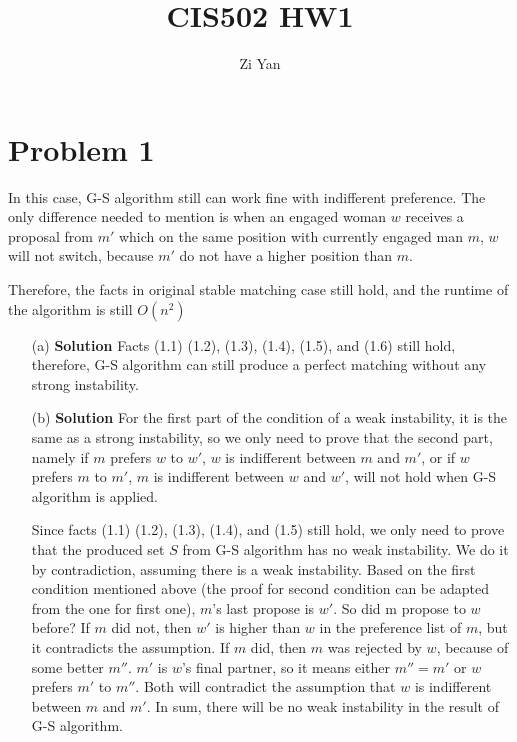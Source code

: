 \documentclass[12pt,letterpaper]{article}
\author{Zi Yan}
\title{CIS502 HW1}
\begin{document}
\maketitle

\section*{Problem 1}
In this case, G-S algorithm still can work fine with indifferent preference. 
The only difference needed to mention is when an engaged woman $w$ receives a 
proposal from $m'$ which on the same position with currently engaged man $m$, 
$w$ will not switch, because $m'$ do not have a higher position than $m$.

Therefore, the facts in original stable matching case still hold, and the 
runtime of the algorithm is still $O(n^2)$
\begin{itemize}
    \item[(a)] \textbf{Solution} Facts (1.1) (1.2), (1.3), (1.4), (1.5), and (1.6) still 
    hold, therefore, G-S algorithm can still produce a perfect matching without
    any strong instability.
    
    \item[(b)] \textbf{Solution} For the first part of the condition of a weak
    instability, it is the same as a strong instability, so we only need to prove
    that the second part, namely if $m$ prefers $w$ to $w'$, $w$ is indifferent
    between $m$ and $m'$, or if $w$ prefers $m$ to $m'$, $m$ is indifferent
    between $w$ and $w'$, will not hold when G-S algorithm is applied. 
    
    Since facts (1.1) (1.2), (1.3), (1.4), and (1.5) still hold, we only need to prove
    that the produced set $S$ from G-S algorithm has no weak instability. We do
    it by contradiction, assuming there is a weak instability. Based on the first 
    condition mentioned above (the proof for second condition can be adapted 
    from the one for first one), $m$'s last propose is $w'$. So did m propose to 
    $w$ before? If $m$ did not, then $w'$ is higher than $w$ in the preference 
    list of $m$, but it contradicts the assumption. If $m$ did, then $m$ was 
    rejected by $w$, because of some better $m''$. $m'$ is $w$'s final partner,
    so it means either $m'' = m'$ or $w$ prefers $m'$ to $m''$. Both will 
    contradict the assumption that $w$ is indifferent between $m$ and $m'$.
    In sum, there will be no weak instability in the result of G-S algorithm.    
\end{itemize}
\end{document}
